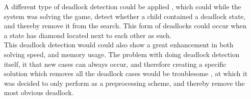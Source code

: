  
 
 
A different type of deadlock detection could be applied , which could while the system was solving the game, detect whether a child contained a deadlock state, and thereby remove it from the search.  This form of deadlocks could occur when a state has diamond located next to each other as such. \\

 
 


 
This deadlock detection would could also show a great enhancement in both solving speed, and memory usage. 
The problem with doing deadlock detection itself, it that new cases can always occur, and therefore creating a specific solution which removes all the deadlock cases would be troublesome , at which it was decided to only perform as a preprocessing scheme, and thereby remove the most obvious deadlock. 




